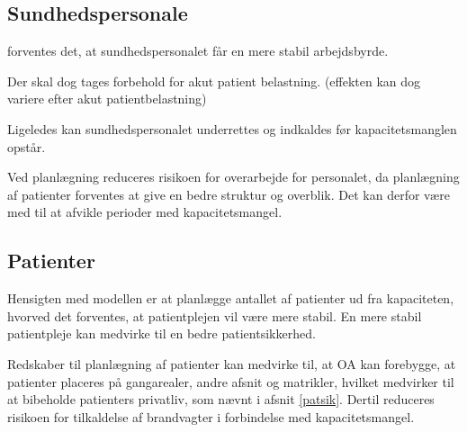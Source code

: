 


\subsection{Sundhedspersonale} \label{sundper}
forventes det, at sundhedspersonalet får en mere stabil arbejdsbyrde. 

Der skal dog tages forbehold for akut patient belastning. (effekten kan dog variere efter akut patientbelastning)



Ligeledes kan sundhedspersonalet underrettes og indkaldes før kapacitetsmanglen opstår.


Ved planlægning reduceres risikoen for overarbejde for personalet, da planlægning af patienter forventes at give en bedre struktur og overblik. Det kan derfor være med til at afvikle perioder med kapacitetsmangel.


\subsection{Patienter}
Hensigten med modellen er at planlægge antallet af patienter ud fra kapaciteten, hvorved det forventes, at patientplejen vil være mere stabil. En mere stabil patientpleje kan medvirke til en bedre patientsikkerhed. 



Redskaber til planlægning af patienter kan medvirke til, at OA kan forebygge, at patienter placeres på gangarealer, andre afsnit og matrikler, hvilket medvirker til at bibeholde patienters privatliv, som nævnt i afsnit \ref{patsik}. Dertil reduceres risikoen for tilkaldelse af brandvagter i forbindelse med kapacitetsmangel. 








